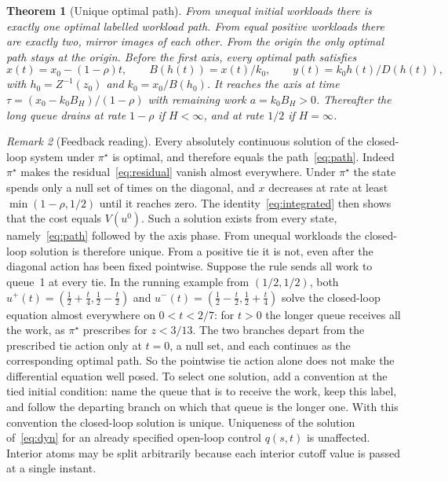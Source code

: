 \documentclass[11pt]{article}
\numberwithin{equation}{section}
\newtheorem{theorem}{Theorem}
\theoremstyle{definition}
\theoremstyle{remark}
\newtheorem{remark}[theorem]{Remark}
\begin{document}
\begin{theorem}[Unique optimal path]\label{thm:unique}
From unequal initial workloads there is exactly one optimal labelled workload path. From equal positive workloads there are exactly two, mirror images of each other. From the origin the only optimal path stays at the origin. Before the first axis, every optimal path satisfies
\begin{equation}\label{eq:path}
x(t)=x_0-(1-\rho)t,\qquad B(h(t))=x(t)/k_0,\qquad y(t)=k_0h(t)/D(h(t)),
\end{equation}
with $h_0=Z^{-1}(z_0)$ and $k_0=x_0/B(h_0)$. It reaches the axis at time $\tau=(x_0-k_0B_H)/(1-\rho)$ with remaining work $a=k_0B_H>0$. Thereafter the long queue drains at rate $1-\rho$ if $H<\infty$, and at rate $1/2$ if $H=\infty$.
\end{theorem}

\begin{remark}[Feedback reading]\label{rem:feedback}
Every absolutely continuous solution of the closed-loop system under $\pi^\star$ is optimal, and therefore equals the path~\eqref{eq:path}. Indeed $\pi^\star$ makes the residual~\eqref{eq:residual} vanish almost everywhere. Under $\pi^\star$ the state spends only a null set of times on the diagonal, and $x$ decreases at rate at least $\min(1-\rho,1/2)$ until it reaches zero. The identity~\eqref{eq:integrated} then shows that the cost equals $V(u^0)$. Such a solution exists from every state, namely~\eqref{eq:path} followed by the axis phase. From unequal workloads the closed-loop solution is therefore unique. From a positive tie it is not, even after the diagonal action has been fixed pointwise. Suppose the rule sends all work to queue~1 at every tie. In the running example from $(1/2,1/2)$, both $u^+(t)=(\frac12+\frac t4,\frac12-\frac t2)$ and $u^-(t)=(\frac12-\frac t2,\frac12+\frac t4)$ solve the closed-loop equation almost everywhere on $0<t<2/7$: for $t>0$ the longer queue receives all the work, as $\pi^\star$ prescribes for $z<3/13$. The two branches depart from the prescribed tie action only at $t=0$, a null set, and each continues as the corresponding optimal path. So the pointwise tie action alone does not make the differential equation well posed. To select one solution, add a convention at the tied initial condition: name the queue that is to receive the work, keep this label, and follow the departing branch on which that queue is the longer one. With this convention the closed-loop solution is unique. Uniqueness of the solution of~\eqref{eq:dyn} for an already specified open-loop control $q(s,t)$ is unaffected. Interior atoms may be split arbitrarily because each interior cutoff value is passed at a single instant.
\end{remark}
\end{document}

